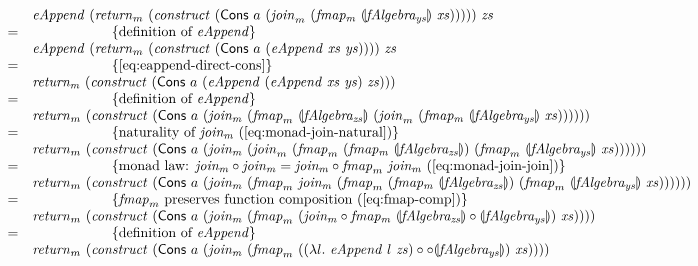 \documentclass{jfp1}
\newcommand{\fold}[1]{\llparenthesis #1 \rrparenthesis}
\newcommand{\eqAnnotation}[1]{\hspace{2cm}\left\{\textrm{#1}\right\}}
\begin{document}
\begin{proof*}
\begin{displaymath}
\begin{array}{cl}
      & \mathit{eAppend}~(\mathit{return}_m~(\mathit{construct}~(\mathsf{Cons}~a~(\mathit{join}_m~(\mathit{fmap_m}~\fold{\mathit{fAlgebra_{ys}}}~\mathit{xs})))))~\mathit{zs} \\
      =&\eqAnnotation{definition of $\mathit{eAppend}$} \\
      & \mathit{eAppend}~(\mathit{return}_m~(\mathit{construct}~(\mathsf{Cons}~a~(\mathit{eAppend}~\mathit{xs}~\mathit{ys}))))~\mathit{zs} \\
      =&\eqAnnotation{\autoref{eq:eappend-direct-cons}} \\
      & \mathit{return_m}~(\mathit{construct}~(\mathsf{Cons}~a~(\mathit{eAppend}~(\mathit{eAppend}~\mathit{xs}~\mathit{ys})~\mathit{zs}))) \\
      =&\eqAnnotation{definition of $\mathit{eAppend}$} \\
      &\mathit{return}_m~(\mathit{construct}~(\mathsf{Cons}~a~(\mathit{join_m}~(\mathit{fmap}_m~\fold{\mathit{fAlgebra_{zs}}}~(\mathit{join}_m~(\mathit{fmap_m}~\fold{\mathit{fAlgebra_{ys}}}~\mathit{xs})))))) \\
      =&\eqAnnotation{naturality of $\mathit{join_m}$ (\autoref{eq:monad-join-natural})} \\
      &\mathit{return}_m~(\mathit{construct}~(\mathsf{Cons}~a~(\mathit{join_m}~(\mathit{join}_m~(\mathit{fmap}_m~(\mathit{fmap_m}~\fold{\mathit{fAlgebra_{zs}}})~(\mathit{fmap}_m~\fold{\mathit{fAlgebra_{ys}}}~\mathit{xs})))))) \\
      =&\eqAnnotation{monad law: $\mathit{join_m} \circ \mathit{join_m} = \mathit{join_m} \circ \mathit{fmap}_m~\mathit{join_m}$ (\autoref{eq:monad-join-join})} \\
      &\mathit{return}_m~(\mathit{construct}~(\mathsf{Cons}~a~(\mathit{join_m}~(\mathit{fmap}_m~\mathit{join_m}~(\mathit{fmap}_m~(\mathit{fmap_m}~\fold{\mathit{fAlgebra_{zs}}})~(\mathit{fmap}_m~\fold{\mathit{fAlgebra_{ys}}}~\mathit{xs})))))) \\
      =&\eqAnnotation{$\mathit{fmap}_m$ preserves function composition (\autoref{eq:fmap-comp})} \\
      & \mathit{return}_m~(\mathit{construct}~(\mathsf{Cons}~a~(\mathit{join_m}~(\mathit{fmap}_m~(\mathit{join_m} \circ \mathit{fmap_m}~\fold{\mathit{fAlgebra_{zs}}} \circ \fold{\mathit{fAlgebra_{ys}}})~\mathit{xs})))) \\
      =&\eqAnnotation{definition of $\mathit{eAppend}$} \\
      & \mathit{return}_m~(\mathit{construct}~(\mathsf{Cons}~a~(\mathit{join_m}~(\mathit{fmap}_m~((\lambda l.~\mathit{eAppend}~l~\mathit{zs}) \circ \circ \fold{\mathit{fAlgebra_{ys}}})~\mathit{xs})))) \\

\end{array}
\end{displaymath}
\end{proof*}
\end{document}
